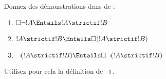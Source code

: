 \documentclass[../../../include/open-logic-section]{subfiles}
\begin{document}
\begin{prob}
  \begin{samepage}Donnez des démonstrations dans  de :
  \begin{enumerate}
    \item $\Box \lnot !A \Entails !A \strictif !B$
    \item $!A \strictif !B \Entails \Box(!A \strictif !B)$
    \item $\lnot(!A \strictif !B)  \Entails \Box\lnot(!A \strictif !B)$
  \end{enumerate}
  Utilisez pour cela la définition de $\strictif$.\end{samepage}
\end{prob}
\end{document}
